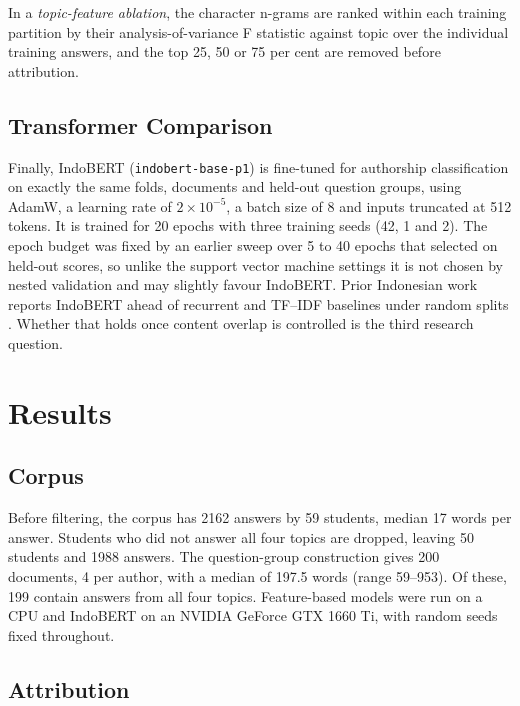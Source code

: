 \documentclass[conference]{IEEEtran}
\begin{document}
In a \textit{topic-feature ablation}, the character n-grams are ranked within each training partition by their analysis-of-variance F statistic against topic over the individual training answers, and the top 25, 50 or 75 per cent are removed before attribution.

\subsection{Transformer Comparison}

Finally, IndoBERT (\texttt{indobert-base-p1}) is fine-tuned for authorship classification on exactly the same folds, documents and held-out question groups, using AdamW, a learning rate of $2 \times 10^{-5}$, a batch size of 8 and inputs truncated at 512 tokens. It is trained for 20 epochs with three training seeds (42, 1 and 2). The epoch budget was fixed by an earlier sweep over 5 to 40 epochs that selected on held-out scores, so unlike the support vector machine settings it is not chosen by nested validation and may slightly favour IndoBERT. Prior Indonesian work reports IndoBERT ahead of recurrent and TF--IDF baselines under random splits \cite{Saputra2023,Saputra2024}. Whether that holds once content overlap is controlled is the third research question.

\section{Results}

\subsection{Corpus}

Before filtering, the corpus has 2162 answers by 59 students, median 17 words per answer. Students who did not answer all four topics are dropped, leaving 50 students and 1988 answers. The question-group construction gives 200 documents, 4 per author, with a median of 197.5 words (range 59--953). Of these, 199 contain answers from all four topics. Feature-based models were run on a CPU and IndoBERT on an NVIDIA GeForce GTX 1660 Ti, with random seeds fixed throughout.

\subsection{Attribution}
\end{document}
